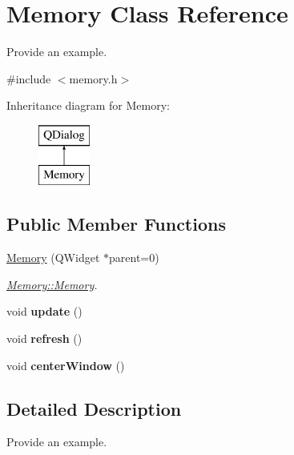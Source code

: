 \hypertarget{class_memory}{\section{Memory Class Reference}
\label{class_memory}
}


Provide an example.  




{\ttfamily \#include $<$memory.\+h$>$}

Inheritance diagram for Memory\+:\begin{figure}[H]
\begin{center}
\leavevmode
\includegraphics[height=2.000000cm]{class_memory}
\end{center}
\end{figure}
\subsection*{Public Member Functions}
\begin{DoxyCompactItemize}
\item 
\hyperlink{class_memory_a243eef3e0fd8d02131e3bcca0471c931}{Memory} (Q\+Widget $\ast$parent=0)
\begin{DoxyCompactList}\small\item\em \hyperlink{class_memory_a243eef3e0fd8d02131e3bcca0471c931}{Memory\+::\+Memory}. \end{DoxyCompactList}\item 
\hypertarget{class_memory_ac367017fbb51cb2d8a334b8063b0e7c2}{void {\bfseries update} ()}\label{class_memory_ac367017fbb51cb2d8a334b8063b0e7c2}

\item 
\hypertarget{class_memory_aedc640c354e83e9f415082bbed99a562}{void {\bfseries refresh} ()}\label{class_memory_aedc640c354e83e9f415082bbed99a562}

\item 
\hypertarget{class_memory_a365f73ddc2ac2c85241ecdbe6c61bf68}{void {\bfseries center\+Window} ()}\label{class_memory_a365f73ddc2ac2c85241ecdbe6c61bf68}

\end{DoxyCompactItemize}


\subsection{Detailed Description}
Provide an example. 

